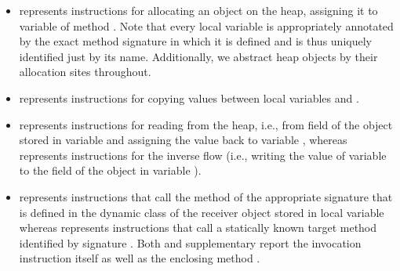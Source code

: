 \begin{itemize}
\item {} represents instructions for allocating an object  on the heap, assigning it to variable  of method . Note that every local variable is appropriately annotated by the exact method signature in which it is defined and is thus uniquely identified just by its name. Additionally, we abstract heap objects by their allocation sites throughout.

\item  {} represents instructions for copying values between local variables  and .

\item {} represents instructions for reading from the heap, i.e., from field  of the object stored in variable  and assigning the value back to variable , whereas  represents instructions for the inverse flow (i.e., writing the value of variable  to the field  of the object in variable ).

\item {} represents instructions that call the method of the appropriate signature  that is defined in the dynamic class of the receiver object stored in local variable  whereas  represents instructions that call a statically known target method identified by signature . Both  and  supplementary report the invocation instruction  itself as well as the enclosing method .
\end{itemize}

